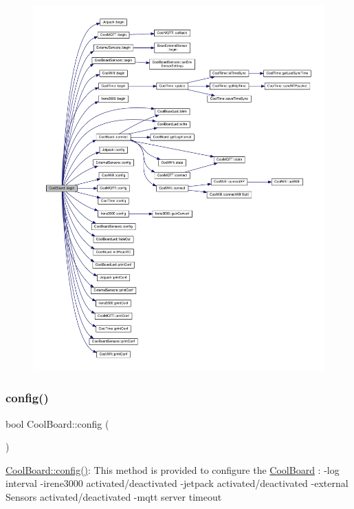 \begin{figure}[H]
\begin{center}
\leavevmode
\includegraphics[width=350pt]{classCoolBoard_acba7c5aef7268b2c0044bdb54d3b9d76_cgraph}
\end{center}
\end{figure}
\mbox{\label{classCoolBoard_a583a874c09c07e70a6eb9229fc4beddb}} 
\subsubsection{\texorpdfstring{config()}{config()}}
{\footnotesize\ttfamily bool Cool\+Board\+::config (\begin{DoxyParamCaption}{ }\end{DoxyParamCaption})}

\hyperlink{classCoolBoard_a583a874c09c07e70a6eb9229fc4beddb}{Cool\+Board\+::config()}\+: This method is provided to configure the \hyperlink{classCoolBoard}{Cool\+Board} \+: -\/log interval -\/irene3000 activated/deactivated -\/jetpack activated/deactivated -\/external Sensors activated/deactivated -\/mqtt server timeout

